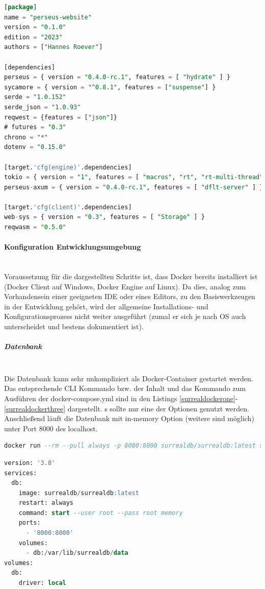 \documentclass[notitlepage, hidelinks]{article}
\begin{document}
\begin{lstlisting}[language=SQL,frame=single,caption=cargo.toml Client,label=toml]
[package]
name = "perseus-website"
version = "0.1.0"
edition = "2023"
authors = ["Hannes Roever"]

[dependencies]
perseus = { version = "0.4.0-rc.1", features = [ "hydrate" ] }
sycamore = { version = "^0.8.1", features = ["suspense"] }
serde = "1.0.152"
serde_json = "1.0.93"
reqwest = {features = ["json"]}
# futures = "0.3"
chrono = "*"
dotenv = "0.15.0"

[target.'cfg(engine)'.dependencies]
tokio = { version = "1", features = [ "macros", "rt", "rt-multi-thread" ] }
perseus-axum = { version = "0.4.0-rc.1", features = [ "dflt-server" ] }

[target.'cfg(client)'.dependencies]
web-sys = { version = "0.3", features = [ "Storage" ] }
reqwasm = "0.5.0"
\end{lstlisting}

\paragraph{Konfiguration Entwicklungsumgebung} \mbox{} \\
Voraussetzung für die dargestellten Schritte ist, dass Docker bereits installiert ist (Docker Client auf Windows, Docker Engine auf Linux). Da dies, analog zum Vorhandensein einer geeigneten IDE oder eines Editors, zu den Basiswerkzeugen in der Entwicklung gehört, wird der allgemeine Installations- und Konfigurationsprozess nicht weiter ausgeführt (zumal er sich je nach OS auch unterscheidet und bestens dokumentiert ist).

\subparagraph{Datenbank} \mbox{} \\
Die Datenbank kann sehr unkompliziert als Docker-Container gestartet werden. Das entsprechende CLI Kommando bzw. der Inhalt und das Kommando zum Ausführen der docker-compose.yml sind in den Listings \ref{surrealdockerone}-\ref{surrealdockerthree} dargestellt. s sollte nur eine der Optionen genutzt werden. Anschließend läuft die Datenbank mit in-memory Option (weitere sind möglich) unter Port 8000 des localhost.

\begin{lstlisting}[language=SQL,frame=single,caption=CLI Command zum Starten des Datenbankcontainers,label=surrealdockerone]
docker run --rm --pull always -p 8000:8000 surrealdb/surrealdb:latest start
\end{lstlisting}

\begin{lstlisting}[language=SQL,frame=single,caption=Alternative mit docker-compose zum Starten des Datenbankcontainers,label=surrealdockertwo]
version: '3.8'
services:
  db:
    image: surrealdb/surrealdb:latest
    restart: always
    command: start --user root --pass root memory
    ports:
      - '8000:8000'
    volumes: 
      - db:/var/lib/surrealdb/data
volumes:
  db:
    driver: local
\end{lstlisting}
\end{document}
